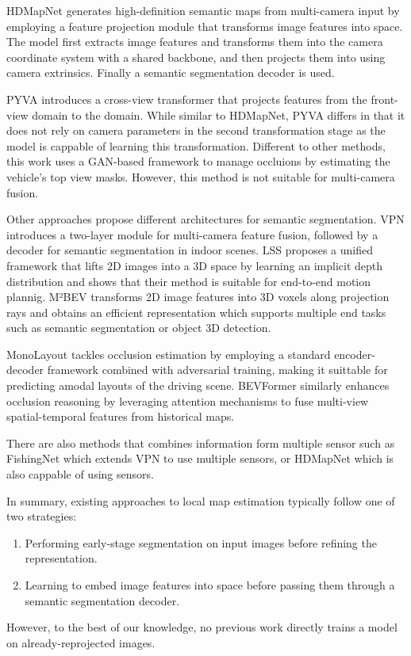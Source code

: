 HDMapNet \cite{HDMapNet} generates high-definition semantic maps from multi-camera input by employing a feature projection module that transforms image features into  space. The model first extracts image features and transforms them into the camera coordinate system with a shared  backbone, and then projects them into  using camera extrinsics. Finally a semantic segmentation decoder is used.

PYVA \cite{PYVA} introduces a cross-view transformer that projects features from the front-view domain to the  domain. While similar to HDMapNet, PYVA differs in that it does not rely on camera parameters in the second transformation stage as the model is cappable of learning this transformation. Different to other methods, this work uses a GAN-based framework to manage occluions by estimating the vehicle's top view masks. However, this method is not suitable for multi-camera fusion.

Other approaches propose different architectures for  semantic segmentation. VPN \cite{view_parsing_network} introduces a two-layer  module for multi-camera feature fusion, followed by a decoder for semantic segmentation in indoor scenes. LSS \cite{lift_splat_shoot} proposes a unified framework that lifts 2D images into a 3D space by learning an implicit depth distribution and shows that their method is suitable for end-to-end motion plannig. M²BEV \cite{m2bev} transforms 2D image features into 3D voxels along projection rays and obtains an efficient  representation which supports multiple end tasks such as semantic segmentation or object 3D detection.

MonoLayout \cite{mono_layout} tackles occlusion estimation by employing a standard encoder-decoder framework combined with adversarial training, making it suittable for predicting amodal layouts of the driving scene. BEVFormer \cite{BEVFormer} similarly enhances occlusion reasoning by leveraging attention mechanisms to fuse multi-view spatial-temporal features from historical  maps.

There are also methods that combines information form multiple sensor such as FishingNet \cite{fishingnet} which extends VPN to use multiple sensors, or HDMapNet which is also cappable of using  sensors.  


In summary, existing approaches to local  map estimation typically follow one of two strategies: 
\begin{enumerate}
    \item Performing early-stage segmentation on input images before refining the  representation.
    \item Learning to embed image features into  space before passing them through a semantic segmentation decoder.
\end{enumerate}
However, to the best of our knowledge, no previous work directly trains a model on already-reprojected  images.

